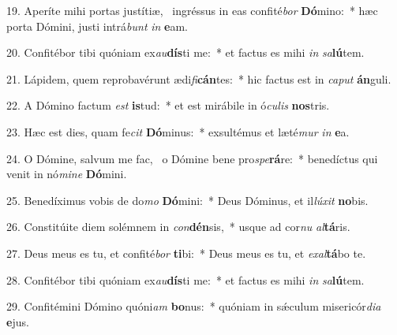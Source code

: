 19. Aperíte mihi portas justítiæ, \dag\  ingréssus in eas confité\textit{bor} \textbf{Dó}mino:~*  hæc porta Dómini, justi intrá\textit{bunt} \textit{in} \textbf{e}am.\

20. Confitébor tibi quóniam ex\textit{au}\textbf{dís}ti me:~*  et factus es mihi \textit{in} \textit{sa}\textbf{lú}tem.\

21. Lápidem, quem reprobavérunt ædi\textit{fi}\textbf{cán}tes:~*  hic factus est in \textit{ca}\textit{put} \textbf{án}guli.\

22. A Dómino factum \textit{est} \textbf{is}tud:~*  et est mirábile in ó\textit{cu}\textit{lis} \textbf{nos}tris.\

23. Hæc est dies, quam fe\textit{cit} \textbf{Dó}minus:~*  exsultémus et læté\textit{mur} \textit{in} \textbf{e}a.\

24. O Dómine, salvum me fac, \dag\  o Dómine bene pro\textit{spe}\textbf{rá}re:~*  benedíctus qui venit in nó\textit{mi}\textit{ne} \textbf{Dó}mini.\

25. Benedíximus vobis de do\textit{mo} \textbf{Dó}mini:~*  Deus Dóminus, et il\textit{lú}\textit{xit} \textbf{no}bis.\

26. Constitúite diem solémnem in \textit{con}\textbf{dén}sis,~*  usque ad cor\textit{nu} \textit{al}\textbf{tá}ris.\

27. Deus meus es tu, et confité\textit{bor} \textbf{ti}bi:~*  Deus meus es tu, et \textit{ex}\textit{al}\textbf{tá}bo te.\

28. Confitébor tibi quóniam ex\textit{au}\textbf{dís}ti me:~*  et factus es mihi \textit{in} \textit{sa}\textbf{lú}tem.\

29. Confitémini Dómino quóni\textit{am} \textbf{bo}nus:~*  quóniam in sǽculum misericór\textit{di}\textit{a} \textbf{e}jus.\

